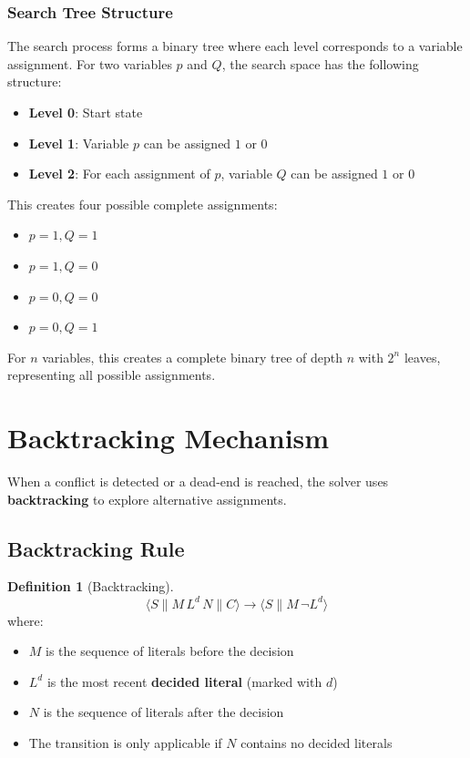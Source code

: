 \documentclass[11pt,a4paper]{article}
\theoremstyle{definition}
\newtheorem{definition}{Definition}[section]
\theoremstyle{plain}
\theoremstyle{remark}
\begin{document}
\subsubsection{Search Tree Structure}

The search process forms a binary tree where each level corresponds to a variable assignment. For two variables $p$ and $Q$, the search space has the following structure:

\begin{itemize}
    \item \textbf{Level 0}: Start state
    \item \textbf{Level 1}: Variable $p$ can be assigned $1$ or $0$
    \item \textbf{Level 2}: For each assignment of $p$, variable $Q$ can be assigned $1$ or $0$
\end{itemize}

This creates four possible complete assignments:
\begin{itemize}
    \item $p=1, Q=1$
    \item $p=1, Q=0$
    \item $p=0, Q=0$
    \item $p=0, Q=1$
\end{itemize}

For $n$ variables, this creates a complete binary tree of depth $n$ with $2^n$ leaves, representing all possible assignments.

\section{Backtracking Mechanism}

When a conflict is detected or a dead-end is reached, the solver uses \textbf{backtracking} to explore alternative assignments.

\subsection{Backtracking Rule}

\begin{tcolorbox}[colback=purple!5!white,colframe=purple!75!black,title=\textbf{Backtracking Transition}]
\begin{definition}[Backtracking]
\[
\langle S \parallel M \, L^d \, N \parallel C \rangle \rightarrow \langle S \parallel M \, \neg L^d \rangle
\]
where:
\begin{itemize}
    \item $M$ is the sequence of literals before the decision
    \item $L^d$ is the most recent \textbf{decided literal} (marked with $d$)
    \item $N$ is the sequence of literals after the decision
    \item The transition is only applicable if $N$ contains no decided literals
\end{itemize}
\end{definition}
\end{tcolorbox}
\end{document}
